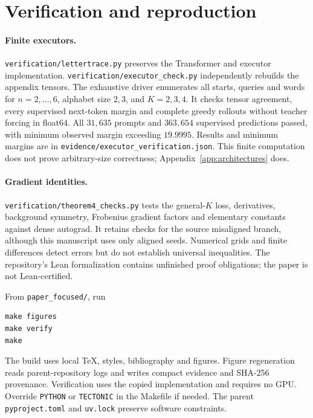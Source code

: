 \section{Verification and reproduction}\label{app:verify}\label{app:reproducibility}
\paragraph{Finite executors.}
\texttt{verification/lettertrace.py} preserves the Transformer and executor implementation. \texttt{verification/executor\_check.py} independently rebuilds the appendix tensors. The exhaustive driver enumerates all starts, queries and words for $n=2,\ldots,6$, alphabet size $2,3$, and $K=2,3,4$. It checks tensor agreement, every supervised next-token margin and complete greedy rollouts without teacher forcing in float64. All $31{,}635$ prompts and $363{,}654$ supervised predictions passed, with minimum observed margin exceeding $19.9995$. Results and minimum margins are in \texttt{evidence/executor\_verification.json}. This finite computation does not prove arbitrary-size correctness; Appendix~\ref{app:architectures} does.

\paragraph{Gradient identities.}
\texttt{verification/theorem4\_checks.py} tests the general-$K$ loss, derivatives, background symmetry, Frobenius gradient factors and elementary constants against dense autograd. It retains checks for the source misaligned branch, although this manuscript uses only aligned seeds. Numerical grids and finite differences detect errors but do not establish universal inequalities. The repository's Lean formalization contains unfinished proof obligations; the paper is not Lean-certified.

From \texttt{paper\_focused/}, run
\begin{verbatim}
make figures
make verify
make
\end{verbatim}
The build uses local TeX, styles, bibliography and figures. Figure regeneration reads parent-repository logs and writes compact evidence and SHA-256 provenance. Verification uses the copied implementation and requires no GPU. Override \texttt{PYTHON} or \texttt{TECTONIC} in the Makefile if needed. The parent \texttt{pyproject.toml} and \texttt{uv.lock} preserve software constraints.

